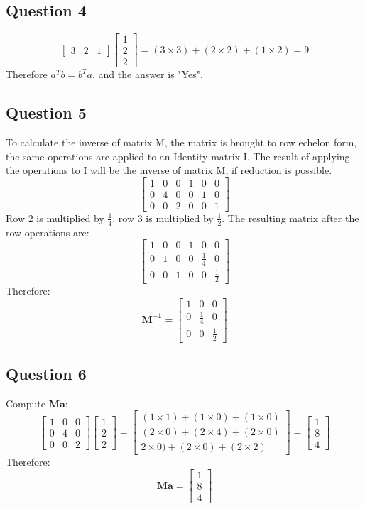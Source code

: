 \documentclass{article}
\begin{document}
\subsection{Question 4}
$$
\begin{bmatrix}
3 & 2 & 1\end{bmatrix}
\begin{bmatrix}
1\\
2\\
2 \end{bmatrix}
= (3 \times 3) + ( 2 \times 2) + (1 \times 2) = 9
$$
Therefore $a^Tb = b^Ta$, and the answer is "Yes". 
\subsection{Question 5}
To calculate the inverse of matrix M, the matrix is brought to row echelon form, the same operations are applied to an Identity matrix I. The result of applying the operations to I will be the inverse of matrix M, if reduction is possible.
$$
\left[\begin{array}{rrr|rrr}
1&0&0&1&0&0\\
0&4&0&0&1&0\\
0&0&2&0&0&1
\end{array}\right]
$$
Row 2 is multiplied by $\frac{1}{4}$, row 3 is multiplied by $\frac{1}{2}$. The resulting matrix after the row operations are:
$$
\left[\begin{array}{rrr|rrr}
1&0&0&1&0&0\\
0&1&0&0& \frac{1}{4} &0\\
0&0&1&0&0&\frac{1}{2}
\end{array}\right]
$$
Therefore:
$$
\mathbf{M^{-1}} =
\begin{bmatrix}
1 & 0 & 0 \\
0 & \frac{1}{4} & 0 \\
0 & 0 & \frac{1}{2}
\end{bmatrix}
$$
\subsection{Question 6}
Compute $ \textbf{Ma}$:
$$
\begin{bmatrix}
1 & 0 & 0 \\
0 & 4 & 0 \\
0 & 0 & 2
\end{bmatrix}
\begin{bmatrix}
1 \\
2 \\
2
\end{bmatrix}
=
\begin{bmatrix}
(1 \times 1) + (1 \times 0) + (1 \times 0) \\
(2 \times 0) + (2 \times 4) + (2 \times 0)  \\
2 \times 0)  + (2\times 0) + (2 \times 2) 
\end{bmatrix}
=
\begin{bmatrix}
1 \\
8 \\
4
\end{bmatrix}
$$
Therefore:
$$
\textbf{Ma} =
\begin{bmatrix}
1 \\
8 \\
4
\end{bmatrix}
$$
\end{document}
